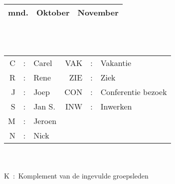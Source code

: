 {\begin{tabular}{||r||p{3em}|p{3em}|p{3em}|p{3em}||p{3em}|p{3em}|p{3em}|p{3em}||}
mnd.&\multicolumn{4}{l||}{Oktober}&\multicolumn{4}{l||}{November} \\ \hline
\end{tabular}
\rm
\hspace{10mm}\\ \\ 
\normalsize
\begin{tabular}{rcp{6em}rcl}
C&:&Carel             &VAK&:&Vakantie             \\
R&:&Rene              &ZIE&:&Ziek                 \\
J&:&Joep              &CON&:&Conferentie bezoek   \\ 
S&:&Jan S.            &INW&:&Inwerken             \\
M&:&Jeroen            &   & &                     \\
N&:&Nick              &   & &                     \\
\end{tabular}\\ \\
K~:~Komplement van de ingevulde groepsleden}
